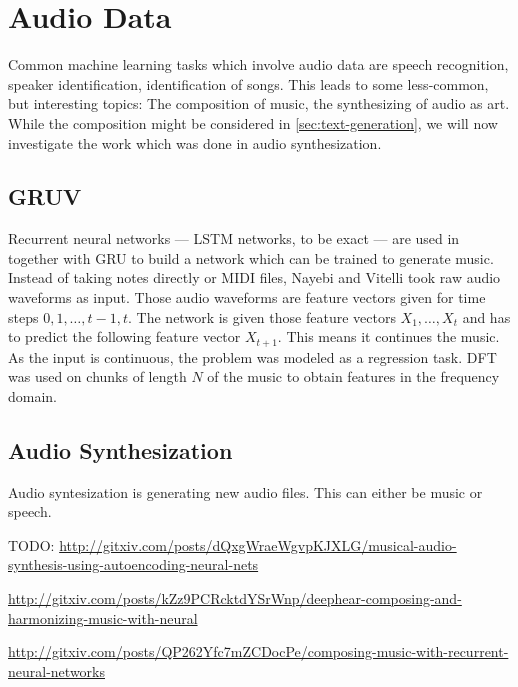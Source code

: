 
\section{Audio Data}
\label{sec:music}

Common machine learning tasks which involve audio data are speech recognition,
speaker identification, identification of songs. This leads to some
less-common, but interesting topics: The composition of music, the synthesizing
of audio as art. While the composition might be considered in
\cref{sec:text-generation}, we will now investigate the work which was done in
audio synthesization.

\subsection{GRUV}

Recurrent neural networks --- \gls{LSTM} networks, to be exact --- are used
in~\cite{nayebigruv} together with \gls{GRU} to build a network which can be
trained to generate music. Instead of taking notes directly or MIDI files,
Nayebi and Vitelli took raw audio waveforms as input. Those audio waveforms are
feature vectors given for time steps $0, 1, \dots, t-1, t$. The network is
given those feature vectors $X_1, \dots, X_t$ and has to predict the following
feature vector $X_{t+1}$. This means it continues the music. As the input is
continuous, the problem was modeled as a regression task. \Gls{DFT} was used on
chunks of length $N$ of the music to obtain features in the frequency domain.


\subsection{Audio Synthesization}
Audio syntesization is generating new audio files. This can either be music or
speech.

TODO: \href{http://gitxiv.com/posts/dQxgWraeWgvpKJXLG/musical-audio-synthesis-using-autoencoding-neural-nets}{http://gitxiv.com/posts/dQxgWraeWgvpKJXLG/musical-audio-synthesis-using-autoencoding-neural-nets}

\href{http://gitxiv.com/posts/kZz9PCRcktdYSrWnp/deephear-composing-and-harmonizing-music-with-neural}{http://gitxiv.com/posts/kZz9PCRcktdYSrWnp/deephear-composing-and-harmonizing-music-with-neural}

\href{http://gitxiv.com/posts/QP262Yfc7mZCDocPe/composing-music-with-recurrent-neural-networks}{http://gitxiv.com/posts/QP262Yfc7mZCDocPe/composing-music-with-recurrent-neural-networks}

